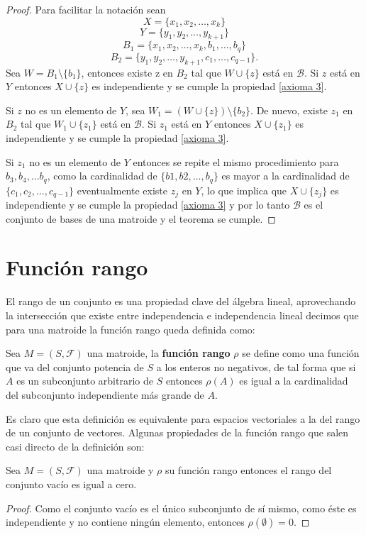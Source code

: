 \begin{proof}
Para facilitar la notación sean 
$$X = \{ x_1, x_2, \dots, x_k\}$$
$$Y = \{ y_1, y_2, \dots, y_{k+1}\}$$
$$B_1 = \{x_1, x_2, \dots, x_k, b_1, \dots, b_q \}$$
$$B_2 = \{y_1, y_2, \dots, y_{k+1}, c_1, \dots, c_{q-1} \}.$$
Sea $W = B_1 \setminus\{ b_1 \} $, entonces existe z en $B_2$ tal que $W \cup \{z\}$ está en $\mathcal{B}$. Si $z$ está en $Y$ entonces $X \cup \{z\}$ es independiente y se cumple la propiedad \ref{axioma 3}. 

Si $z$ no es un elemento de $Y$, sea $W_1= (W \cup \{ z \}) \setminus \{ b_2 \}$. De nuevo, existe $z_1$ en $B_2$ tal que $W_1 \cup \{ z_1 \}$ está en $\mathcal{B}$. Si $z_1$ está en $Y$ entonces $X \cup \{z_1\}$ es independiente y se cumple la propiedad \ref{axioma 3}. 

Si $z_1$ no es un elemento de $Y$ entonces se repite el mismo procedimiento para $b_3, b_4, \dots b_q$, como la cardinalidad de $\{ b1, b2, \dots, b_q\}$ es mayor a la cardinalidad de $\{c_1,c_2, \dots, c_{q-1}\}$ eventualmente existe $z_j$ en $Y$, lo que implica que $X \cup \{z_j\}$ es independiente y se cumple la propiedad \ref{axioma 3} y por lo tanto $\mathcal{B}$ es el conjunto de bases de una matroide y el teorema se cumple. 
\end{proof}

\section{Función rango}
El rango de un conjunto es una propiedad clave del álgebra lineal, aprovechando la intersección que existe entre independencia e independencia lineal decimos que para una matroide la función rango queda definida como: 

\begin{dfn}
Sea $M=(S,\mathcal{F})$ una matroide, la \textbf{función rango} $\rho$ se define como una función que va del conjunto potencia de $S$ a los enteros no negativos, de tal forma que si $A$ es un subconjunto arbitrario de $S$ entonces $\rho(A)$ es igual a la cardinalidad del subconjunto independiente más grande de $A$.
\end{dfn}

Es claro que esta definición es equivalente para espacios vectoriales a la del rango de un conjunto de vectores. Algunas propiedades de la función rango que salen casi directo de la definición son:
\begin{cor}\label{R1}
Sea $M=(S,\mathcal{F})$ una matroide y $\rho$ su función rango entonces
el rango del conjunto vacío es igual a cero. 
\end{cor}
\begin{proof} Como el conjunto vacío es el único subconjunto de sí mismo, como éste es independiente y no contiene ningún elemento, entonces $\rho(\emptyset)=0$. \end{proof}

